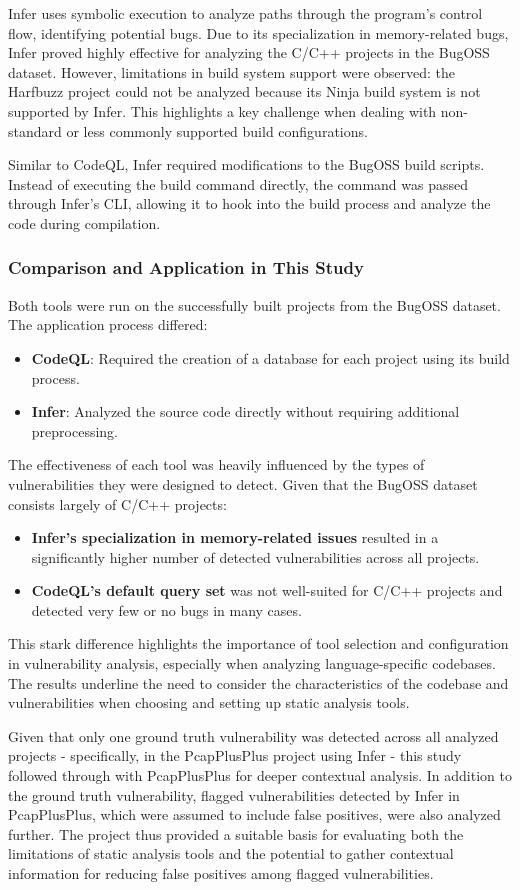 Infer uses symbolic execution to analyze paths through the program's control flow, identifying potential bugs. Due to its specialization in memory-related bugs, Infer proved highly effective for analyzing the C/C++ projects in the BugOSS dataset. However, limitations in build system support were observed: the Harfbuzz project could not be analyzed because its Ninja build system is not supported by Infer. This highlights a key challenge when dealing with non-standard or less commonly supported build configurations.

Similar to CodeQL, Infer required modifications to the BugOSS build scripts. Instead of executing the build command directly, the command was passed through Infer's CLI, allowing it to hook into the build process and analyze the code during compilation.

\subsubsection{Comparison and Application in This Study}
Both tools were run on the successfully built projects from the BugOSS dataset. The application process differed:
\begin{itemize}
    \item \textbf{CodeQL}: Required the creation of a database for each project using its build process.
    \item \textbf{Infer}: Analyzed the source code directly without requiring additional preprocessing.
\end{itemize}

The effectiveness of each tool was heavily influenced by the types of vulnerabilities they were designed to detect. Given that the BugOSS dataset consists largely of C/C++ projects:
\begin{itemize}
    \item \textbf{Infer's specialization in memory-related issues} resulted in a significantly higher number of detected vulnerabilities across all projects.
    \item \textbf{CodeQL's default query set} was not well-suited for C/C++ projects and detected very few or no bugs in many cases.
\end{itemize}

This stark difference highlights the importance of tool selection and configuration in vulnerability analysis, especially when analyzing language-specific codebases. The results underline the need to consider the characteristics of the codebase and vulnerabilities when choosing and setting up static analysis tools.

Given that only one ground truth vulnerability was detected across all analyzed projects - specifically, in the PcapPlusPlus project using Infer - this study followed through with PcapPlusPlus for deeper contextual analysis. In addition to the ground truth vulnerability, flagged vulnerabilities detected by Infer in PcapPlusPlus, which were assumed to include false positives, were also analyzed further. The project thus provided a suitable basis for evaluating both the limitations of static analysis tools and the potential to gather contextual information for reducing false positives among flagged vulnerabilities.
